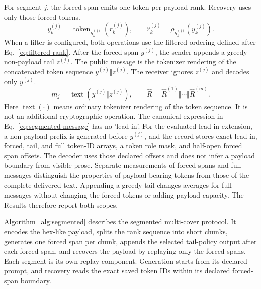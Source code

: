 \documentclass[fleqn,10pt]{wlscirep}
\begin{document}
For segment \(j\), the forced span emits one token per payload rank. Recovery uses only those forced tokens.
\begin{equation}
y^{(j)}_k=
\operatorname{token}_{h^{(j)}_k}\left(r^{(j)}_k\right),
\qquad
\hat r^{(j)}_k=
\rho_{h^{(j)}_k}\left(y^{(j)}_k\right).
\label{eq:segmented-forced-span}
\end{equation}
When a filter is configured, both operations use the filtered ordering defined after Eq.~\eqref{eq:filtered-rank}. After the forced span \(y^{(j)}\), the sender appends a greedy non-payload tail \(z^{(j)}\). The public message is the tokenizer rendering of the concatenated token sequence \(y^{(j)}\Vert z^{(j)}\). The receiver ignores \(z^{(j)}\) and decodes only \(y^{(j)}\).
\begin{equation}
m_j=\operatorname{text}\left(y^{(j)}\Vert z^{(j)}\right),
\qquad
\hat R=\hat R^{(1)}\Vert\cdots\Vert\hat R^{(m)}.
\label{eq:segmented-message}
\end{equation}
Here \(\operatorname{text}(\cdot)\) means ordinary tokenizer rendering of the token sequence. It is not an additional cryptographic operation. The canonical expression in Eq.~\eqref{eq:segmented-message} has no 'lead-in'. For the evaluated lead-in extension, a non-payload prefix is generated before \(y^{(j)}\), and the record stores exact lead-in, forced, tail, and full token-ID arrays, a token role mask, and half-open forced span offsets. The decoder uses those declared offsets and does not infer a payload boundary from visible prose.
Separate measurements of forced spans and full messages distinguish the properties of payload-bearing tokens from those of the complete delivered text. Appending a greedy tail changes averages for full messages without changing the forced tokens or adding payload capacity. The Results therefore report both scopes.

Algorithm~\ref{alg:segmented} describes the segmented multi-cover protocol. It encodes the hex-like payload, splits the rank sequence into short chunks, generates one forced span per chunk, appends the selected tail-policy output after each forced span, and recovers the payload by replaying only the forced spans. Each segment is its own replay component. Generation starts from its declared prompt, and recovery reads the exact saved token IDs within its declared forced-span boundary.
\end{document}
